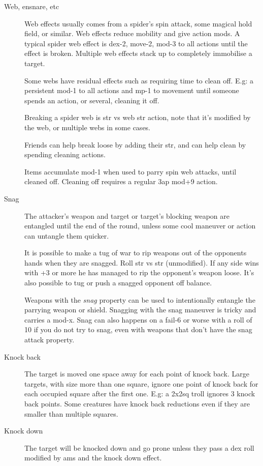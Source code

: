 \begin{description}
\item[Web, ensnare, etc]
Web effects usually comes from a spider's spin attack, some magical hold field, or similar. Web effects reduce mobility and give action mods.
A typical spider web effect is dex-2, move-2, mod-3 to all actions until the effect is broken. Multiple web effects stack up to completely immobilise a target.

Some webs have residual effects such as requiring time to clean off. E.g: a persistent mod-1 to all actions and mp-1 to movement until someone spends an action, or several, cleaning it off.

Breaking a spider web is str vs web str action, note that it's modified by the web, or multiple webs in some cases.

Friends can help break loose by adding their str, and can help clean by spending cleaning actions.

Items accumulate mod-1 when used to parry spin web attacks, until cleaned off. Cleaning off requires a regular 3ap mod+9 action.


\item[Snag]
The attacker's weapon and target or target's blocking weapon are entangled until the end of the round, unless some cool maneuver or action can untangle them quicker.

It is possible to make a tug of war to rip weapons out of the opponents hands when they are snagged. Roll str vs str (unmodified). If any side wins with +3 or more he has managed to rip the opponent's weapon loose. It's also possible to tug or push a snagged opponent off balance.

Weapons with the \emph{snag} property can be used to intentionally entangle the parrying weapon or shield. Snagging with the snag maneuver is tricky and carries a mod-x. Snag can also happens on a fail-6 or worse with a roll of 10 if you do not try to snag, even with weapons that don't have the snag attack property.


\item[Knock back]
The target is moved one space away for each point of knock back. 
Large targets, with size more than one square, ignore one point of knock back for each occupied square after the first one. E.g: a 2x2sq troll ignores 3 knock back points.
Some creatures have knock back reductions even if they are smaller than multiple squares.


\item[Knock down]
The target will be knocked down and go prone unless they pass a dex roll modified by ams and the knock down effect.


\end{description}






